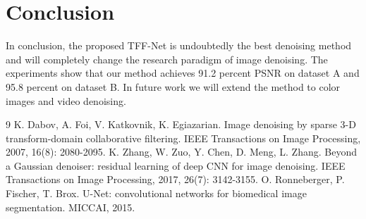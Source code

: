 \documentclass[11pt]{article}
\begin{document}
\section{Conclusion}
In conclusion, the proposed TFF-Net is undoubtedly the best denoising method and will completely change the research paradigm of image denoising. The experiments show that our method achieves 91.2 percent PSNR on dataset A and 95.8 percent on dataset B. In future work we will extend the method to color images and video denoising.

\begin{thebibliography}{9}
 K. Dabov, A. Foi, V. Katkovnik, K. Egiazarian. Image denoising by sparse 3-D transform-domain collaborative filtering. IEEE Transactions on Image Processing, 2007, 16(8): 2080-2095.
 K. Zhang, W. Zuo, Y. Chen, D. Meng, L. Zhang. Beyond a Gaussian denoiser: residual learning of deep CNN for image denoising. IEEE Transactions on Image Processing, 2017, 26(7): 3142-3155.
 O. Ronneberger, P. Fischer, T. Brox. U-Net: convolutional networks for biomedical image segmentation. MICCAI, 2015.
\end{thebibliography}
\end{document}
